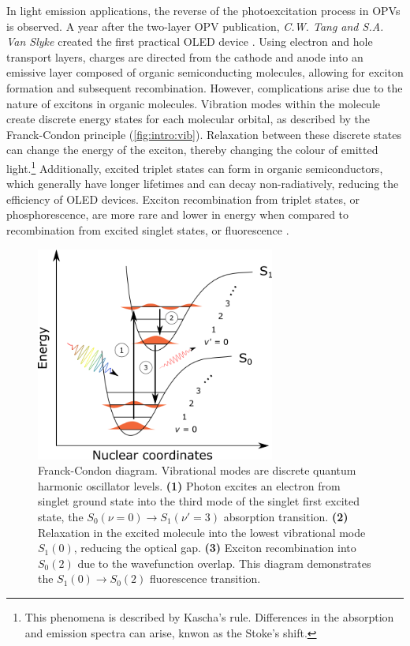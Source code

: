 In light emission applications, the reverse of the photoexcitation process in \acp{OPV} is observed. A year after the two-layer \ac{OPV} publication, \emph{C.W. Tang and S.A. Van Slyke} created the first practical \ac{OLED} device \citep{Tang1987}. Using electron and hole transport layers, charges are directed from the cathode and anode into an emissive layer composed of organic semiconducting molecules, allowing for exciton formation and subsequent recombination. However, complications arise due to the nature of excitons in organic molecules. Vibration modes within the molecule create discrete energy states for each molecular orbital, as described by the Franck-Condon principle (\autoref{fig:intro:vib}). Relaxation between these discrete states can change the energy of the exciton, thereby changing the colour of emitted light.\footnote{This phenomena is described by Kascha's rule. Differences in the absorption and emission spectra can arise, knwon as the Stoke's shift.} Additionally, excited triplet states can form in organic semiconductors, which generally have longer lifetimes and can decay non-radiatively, reducing the efficiency of \ac{OLED} devices. Exciton recombination from triplet states, or phosphorescence, are more rare and lower in energy when compared to recombination from excited singlet states, or fluorescence \citep{kohler2009triplet}.

\begin{figure}[t]
    \centering
    \includegraphics[width=0.7\textwidth]{pictures/franck_condon_transitions.png}
    \caption{Franck-Condon diagram. Vibrational modes are discrete quantum harmonic oscillator levels. \textbf{(1)} Photon excites an electron from singlet ground state into the third mode of the singlet first excited state, the $S_0(\nu=0) \rightarrow S_1(\nu'=3)$ absorption transition. \textbf{(2)} Relaxation in the excited molecule into the lowest vibrational mode $S_1(0)$, reducing the optical gap. \textbf{(3)} Exciton recombination into $S_0(2)$ due to the wavefunction overlap. This diagram demonstrates the $S_1(0) \rightarrow S_0(2)$ fluorescence transition.}
    \label{fig:intro:vib}
\end{figure}



